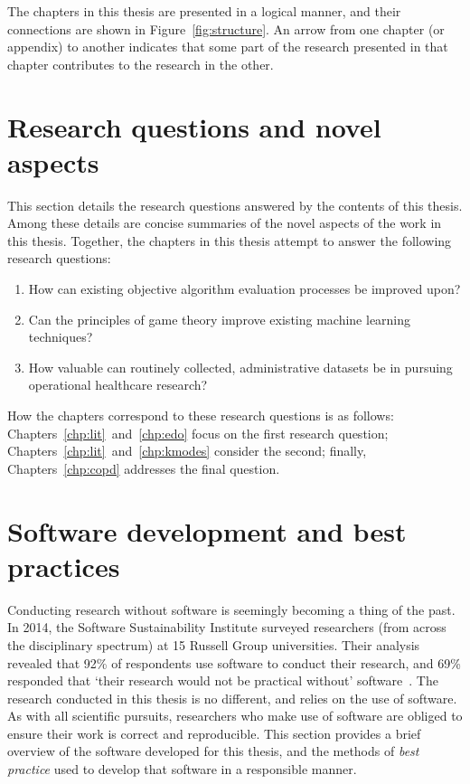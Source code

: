 The chapters in this thesis are presented in a logical manner, and their
connections are shown in Figure~\ref{fig:structure}. An arrow from one chapter
(or appendix) to another indicates that some part of the research presented in
that chapter contributes to the research in the other. 


\section{Research questions and novel aspects}\label{sec:questions}

This section details the research questions answered by the contents of this
thesis. Among these details are concise summaries of the novel aspects of the
work in this thesis. Together, the chapters in this thesis attempt to answer
the following research questions:

\begin{enumerate}
    \item How can existing objective algorithm evaluation processes be improved
        upon?
    \item Can the principles of game theory improve existing machine learning
        techniques?
    \item How valuable can routinely collected, administrative datasets be in
        pursuing operational healthcare research?
\end{enumerate}

How the chapters correspond to these research questions is as follows:
Chapters~\ref{chp:lit}~and~\ref{chp:edo} focus on the first research question;
Chapters~\ref{chp:lit}~and~\ref{chp:kmodes} consider the second; finally,
Chapters~\ref{chp:copd} addresses the final question.


\section{Software development and best practices}\label{sec:dev}

Conducting research without software is seemingly becoming a thing of the past.
In 2014, the Software Sustainability Institute surveyed researchers (from across
the disciplinary spectrum) at 15 Russell Group universities. Their analysis
revealed that 92\% of respondents use software to conduct their research, and
69\% responded that `their research would not be practical without'
software~\cite{Hettrick2014}. The research conducted in this thesis is no
different, and relies on the use of software. As with all scientific pursuits,
researchers who make use of software are obliged to ensure their work is correct
and reproducible. This section provides a brief overview of the software
developed for this thesis, and the methods of \emph{best practice} used to
develop that software in a responsible manner.

